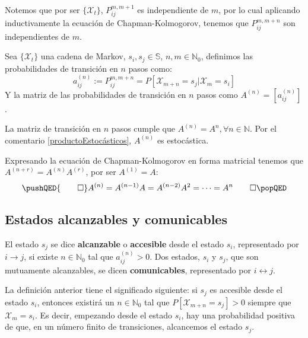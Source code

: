 Notemos que por ser $\{\mathcal{X}_t\}$, $P_{ij}^{m,m+1}$ es independiente de $m$, por lo cual aplicando inductivamente la ecuación de Chapman-Kolmogorov, tenemos que $P_{ij}^{m,m+n}$ son independientes de $m$. 
\begin{definition}
Sea $\{\mathcal{X}_t\}$ una cadena de Markov, $s_i, s_j \in \mathbb{S}$, $n,m\in\mathbb{N}_0$,  definimos las probabilidades de transición en $n$ pasos como:
\[a_{ij}^{(n)}:=P_{ij}^{m,m+n}=P[\mathcal{X}_{m+n}=s_j|\mathcal{X}_m=s_i]\]
Y la matriz de las probabilidades de transición en $n$ pasos como $A^{(n)}=[a_{ij}^{(n)}]$.
\end{definition}
\begin{lemma}
La matriz de transición en $n$ pasos cumple que $A^{(n)}=A^n, \forall n\in\mathbb{N}$. Por el comentario \ref{productoEstocásticos}, $A^{(n)}$ es estocástica.
\end{lemma}
\begin{proofs*}
 Expresando la ecuación de Chapman-Kolmogorov en forma matricial tenemos que $A^{(n+r)}=A^{(n)}A^{(r)}$, por ser $A^{(1)}=A$:
    \[
    \pushQED{\qed}
    A^{(n)}=A^{(n-1)}A=A^{(n-2)}A^2=\dots=A^n \qedhere
    \popQED\]    
\end{proofs*}

\subsection{Estados alcanzables y comunicables}
\begin{definition}
    El estado $s_j$ se dice \textbf{alcanzable} o \textbf{accesible} desde el estado $s_i$, representado por $i\longrightarrow j$, si existe $n\in\mathbb{N}_0$ tal que $a_{ij}^{(n)}>0$. Dos estados, $s_i$ y $s_j$, que son mutuamente alcanzables, se dicen \textbf{comunicables}, representado por $i\longleftrightarrow j$.
\end{definition}

La definición anterior tiene el significado siguiente: si $s_j$ es accesible desde el estado $s_i$, entonces existirá un $n\in\mathbb{N}_0$ tal que $P[\mathcal{X}_{m+n}=s_j]>0$ siempre que $\mathcal{X}_m=s_i$.  Es decir, empezando desde el estado $s_i$, hay una probabilidad positiva de que, en un número finito de transiciones, alcancemos el estado $s_j$.

